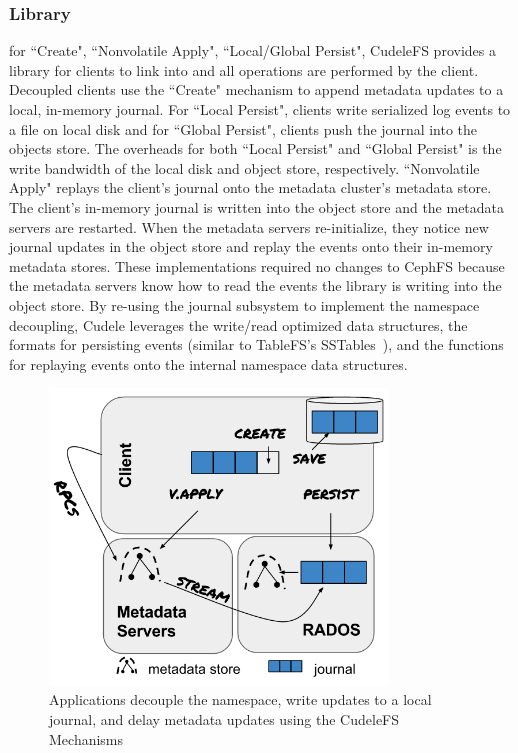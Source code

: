 \subsubsection{Library} for ``Create", ``Nonvolatile Apply", ``Local/Global
Persist", CudeleFS provides a library for clients to link into and all
operations are performed by the client.  Decoupled clients use the ``Create"
mechanism to append metadata updates to a local, in-memory journal.  For
``Local Persist", clients write serialized log events to a file on local disk
and for ``Global Persist", clients push the journal into the objects store. The
overheads for both ``Local Persist" and ``Global Persist" is the write
bandwidth of the local disk and object store, respectively.  ``Nonvolatile
Apply" replays the client's journal onto the metadata cluster's metadata store.
The client's in-memory journal is written into the object store and the
metadata servers are restarted. When the metadata servers re-initialize, they
notice new journal updates in the object store and replay the events onto their
in-memory metadata stores.  These implementations required no changes to CephFS
because the metadata servers know how to read the events the library is writing
into the object store.  By re-using the journal subsystem to implement the
namespace decoupling, Cudele leverages the write/read optimized data
structures, the formats for persisting events (similar to TableFS's
SSTables~\cite{ren:atc2013-tablefs}), and the functions for replaying events
onto the internal namespace data structures.

\begin{figure}[tb]
\centering
\includegraphics[width=90mm]{figures/fig-decouple.png}
\caption{Applications decouple the namespace, write updates to a local journal,
and delay metadata updates using the CudeleFS Mechanisms }\label{fig:decouple}
\end{figure}

